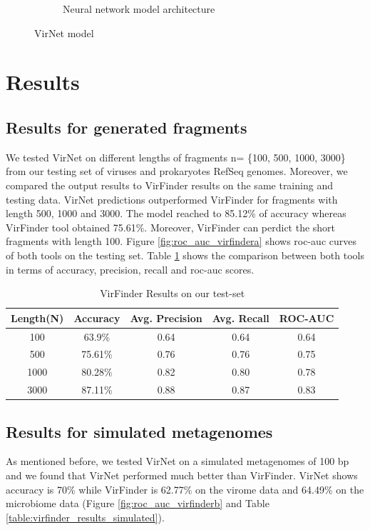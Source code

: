 \documentclass[conference]{IEEEtran}
\begin{document}
\begin{figure}
\begin{subfigure}{0.4\textwidth}
		\caption{Neural network model architecture} 
		\label{fig:model_diagram}
	\end{subfigure}
	\caption{VirNet model} 
	\label{fig:model_arch}
\end{figure}

\section{Results}

\subsection{Results for generated fragments}
We tested VirNet on different lengths of fragments n= \{100, 500, 1000, 3000\} from our testing set of viruses and prokaryotes RefSeq genomes. Moreover, we compared the output results to VirFinder results on the same training and testing data. VirNet predictions outperformed VirFinder for fragments with length 500, 1000 and 3000. The model reached to 85.12\% of accuracy whereas VirFinder tool obtained 75.61\%. Moreover, VirFinder can perdict the short fragments with length 100. Figure \ref{fig:roc_auc_virfindera} shows roc-auc curves of both tools on the testing set. Table \ref{table:virfinder_results} shows the comparison between both tools in terms of accuracy, precision, recall and roc-auc scores.

\begin{table}[h!]
	\centering
	\begin{tabular}{||c c c c c||} 
		Length(N) &	Accuracy & Avg. Precision & Avg. Recall &	ROC-AUC \\ [0.5ex] 
		\hline\hline
		100 &	63.9\%	& 0.64 & 0.64 & 0.64 \\
		500 &	75.61\% &	0.76 & 0.76 & 0.75 \\
		1000 &	80.28\% & 0.82 & 0.80 & 0.78 \\
		3000 &	87.11\% & 0.88 & 0.87 & 0.83\\[1ex]
	\end{tabular}
	\caption{VirFinder Results on our test-set}
	\label{table:virfinder_results}
\end{table}


\subsection{Results for simulated metagenomes}

As mentioned before, we tested VirNet on a simulated metagenomes of 100 bp and we found that VirNet performed much better than VirFinder. VirNet shows accuracy is 70\% while VirFinder is 62.77\% on the virome data and 64.49\% on the microbiome data (Figure \ref{fig:roc_auc_virfinderb} and Table \ref{table:virfinder_results_simulated}).
\end{document}
